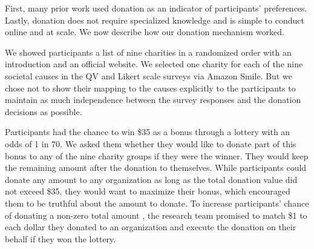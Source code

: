  First, many prior work \cite{Xiao2019, benz2008people, gendall2010effect, hsieh2010pay, hsieh2016you} used donation as an indicator of participants' preferences.  Lastly, donation does not require specialized knowledge and is simple to conduct online and at scale. We now describe how our donation mechanism worked.

We showed participants a list of nine charities in a randomized order with an introduction and an official website. We selected one charity for each of the nine societal causes in the QV and Likert scale surveys via Amazon Smile. But we chose not to show their mapping to the causes explicitly to the participants to maintain as much independence between the survey responses and the donation decisions as possible. 

Participants had the chance to win \$35 as a bonus through a lottery with an odds of 1 in 70. We asked them whether they would like to donate part of this bonus to any of the nine charity groups if they were the winner. They would keep the remaining amount after the donation to themselves. While participants could donate any amount to any organization as long as the total donation value did not exceed \$35, they would want to maximize their bonus, which encouraged them to be truthful about the amount to donate. To increase participants' chance of donating a non-zero total amount \cite{meier2007subsidies}, the research team promised to match \$1 to each dollar they donated to an organization and execute the donation on their behalf if they won the lottery. 


